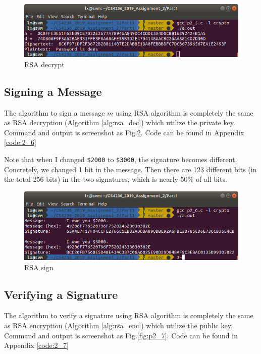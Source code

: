 \begin{figure}[ht]
\centering
\includegraphics[width=\columnwidth]{resources/p2_5.png}
\caption{
    RSA decrypt
}
\label{fig:p2_5}
\end{figure}

\subsection{Signing a Message}
\label{subs:sign}

The algorithm to sign a message $m$ using RSA algorithm is completely the same as RSA decryption (Algorithm \ref{alg:rsa_dec}) which utilize the private key.
Command and output is screenshot as Fig.\ref{fig:p2_6}.
Code can be found in Appendix \ref{code:2_6}

Note that when I changed \texttt{\$2000} to \texttt{\$3000}, the signature becomes different. Concretely, we changed 1 bit in the message. Then there are 123 different bits (in the total 256 bits) in the two signatures, which is nearly 50\% of all bits.

\begin{figure}[ht]
\centering
\includegraphics[width=\columnwidth]{resources/p2_6.png}
\caption{
    RSA sign
}
\label{fig:p2_6}
\end{figure}

\subsection{Verifying a Signature}

The algorithm to verify a signature using RSA algorithm is completely the same as RSA encryption (Algorithm \ref{alg:rsa_enc}) which utilize the public key.
Command and output is screenshot as Fig.\ref{fig:p2_7}.
Code can be found in Appendix \ref{code:2_7}

